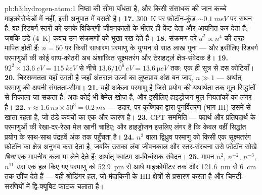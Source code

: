 \begin{solution}{pb:b3:hydrogen-atom:1}
निष्ठा की सीमा बाँधता है, और किसी संसाधक की जान कच्चे
माइक्रोसेकंडों में नहीं, इसी अनुपात में बसती है।
\textbf{17.} \qty{300}{K} पर फ़ोटॉन-कुंड
$\sim\qty{0.1}{meV}$ पर सघन है: वह रिडबर्ग स्तरों को उनके विकिरणी
जीवनकालों के भीतर ही फेंट देता और आयनित कर देता है; जबकि ठंडे
(\qty{4}{K}) कवच उन संक्रमणों को भूखा रख देते हैं।
\textbf{18.} संक्रमण-दरें $d^2 \propto n^4$ की तरह मापित होती हैं: $n =
50$ पर किसी साधारण परमाणु के युग्मन से साठ लाख गुना --- और इसीलिए
रिडबर्ग परमाणुओं की कोई वाष्प-कोठरी अब अंशांकित सूक्ष्मतरंग और
टेराहर्ट्ज़ क्षेत्र-संवेदक है।
\textbf{19.} $92^2 \times \qty{13.6}{eV} = \qty{115}{keV}$ से नीचे
$13.6/10^6\,\unit{eV} = \qty{13.6}{\micro eV}$ तक: एक ही सूत्र से
दस कोटियाँ।
\textbf{20.} चिरसम्मतता वहाँ उगती है जहाँ अंतराल ऊर्जा का लुप्तप्राय
अंश बन जाए, $n \gg 1$ --- अर्थात् परमाणु की अपनी
संगतता-सीमा।
\textbf{21.} यही अकेला परमाणु है जिसे प्रयोग की यथार्थता तक मूल
सिद्धांतों से निकाला जा सकता है: अतः कोई भी बेमेल खोज है, और इसीलिए
हाइड्रोजन मूल नियतांकों का लंगर है।
\textbf{22.} $\tau \approx 1.6\,\unit{ns} \times 50^3 =
\qty{0.2}{ms}$ --- उदार, पर कृष्णिका द्वारा पुनर्वितरण (भाग
III) उसमें से खाता रहता है, जो ठंडे कवचों का एक और कारण है।
\textbf{23.} CPT सममिति --- पदार्थ और प्रतिपदार्थ के परमाणुओं की
रेखा-दर-रेखा मेल खानी चाहिए; और हाइड्रोजन इसलिए लंगर है कि केवल वहीं
सिद्धांत प्रयोग के साथ-साथ पंद्रहवें अंक तक पहुँचता है।
\textbf{24.} $n^2$ वाला द्विध्रुव परमाणु को किसी एक
सूक्ष्मतरंग फ़ोटॉन का क्षेत्र अनुभव करा देता है, जबकि उसका लंबा
जीवनकाल और स्तर-संरचना उसे फ़ोटॉन सोखे \emph{बिना} एक मापनीय कला पा
लेने देते हैं: अर्थात् क्वांटम अ-विध्वंसक संवेदन।
\textbf{25.} मापन $n^2$, $n^{-2}$, $n^{-3}$, $n^{11}$ उस एक हल किए
गए परमाणु को \qty{52.9}{pm} से आधे माइक्रोमीटर तक और
\qty{121.6}{nm} से \qty{6}{cm} तक खींच देते हैं --- वही श्रोडिंगर
हल, जो मंदाकिनी के HII क्षेत्रों से प्रसारण करता है और चिमटी-सरणियों
में द्वि-क्यूबिट फाटक चलाता है।
\end{solution}
